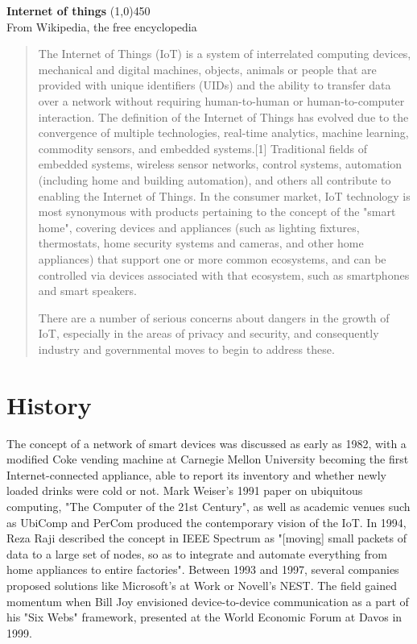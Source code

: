 \documentclass[12pt, a4paper, twoside]{article}
\begin{document}

\newpage
\tableofcontents
\newpage
\listoffigures
\newpage
\begin{flushleft}
\textbf{{\huge Internet of things}}
\line(1,0){450}\\
[2mm]
From Wikipedia, the free encyclopedia \par
\begin{abstract}
The Internet of Things (IoT) is a system of interrelated computing devices, mechanical and digital machines, objects, animals or people that are provided with unique identifiers (UIDs) and the ability to transfer data over a network without requiring human-to-human or human-to-computer interaction.
The definition of the Internet of Things has evolved due to the convergence of multiple technologies, real-time analytics, machine learning, commodity sensors, and embedded systems.[1] Traditional fields of embedded systems, wireless sensor networks, control systems, automation (including home and building automation), and others all contribute to enabling the Internet of Things. In the consumer market, IoT technology is most synonymous with products pertaining to the concept of the "smart home", covering devices and appliances (such as lighting fixtures, thermostats, home security systems and cameras, and other home appliances) that support one or more common ecosystems, and can be controlled via devices associated with that ecosystem, such as smartphones and smart speakers.

There are a number of serious concerns about dangers in the growth of IoT, especially in the areas of privacy and security, and consequently industry and governmental moves to begin to address these.
\end{abstract}
\end{flushleft}
\newpage

\section{History}
The concept of a network of smart devices was discussed as early as 1982, with a modified Coke vending machine at Carnegie Mellon University becoming the first Internet-connected appliance, able to report its inventory and whether newly loaded drinks were cold or not. Mark Weiser's 1991 paper on ubiquitous computing, "The Computer of the 21st Century", as well as academic venues such as UbiComp and PerCom produced the contemporary vision of the IoT. In 1994, Reza Raji described the concept in IEEE Spectrum as "[moving] small packets of data to a large set of nodes, so as to integrate and automate everything from home appliances to entire factories". Between 1993 and 1997, several companies proposed solutions like Microsoft's at Work or Novell's NEST. The field gained momentum when Bill Joy envisioned device-to-device communication as a part of his "Six Webs" framework, presented at the World Economic Forum at Davos in 1999.
\end{document}
